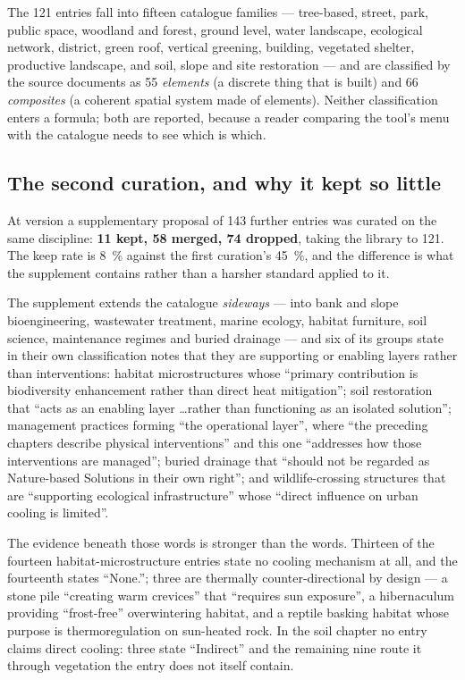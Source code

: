 The \num{121} entries fall into fifteen catalogue families --- tree-based,
street, park, public space, woodland and forest, ground level, water landscape,
ecological network, district, green roof, vertical greening, building,
vegetated shelter, productive landscape, and soil, slope and site restoration
--- and are classified by the source documents as \num{55} \emph{elements} (a
discrete thing that is built) and \num{66} \emph{composites} (a coherent
spatial system made of elements). Neither classification enters a formula; both
are reported, because a reader comparing the tool's menu with the catalogue
needs to see which is which.

\subsection{The second curation, and why it kept so little}
\label{sec:supplement}

At version \methver{} a supplementary proposal of \num{143} further entries was
curated on the same discipline: \textbf{\num{11} kept, \num{58} merged,
\num{74} dropped}, taking the library to \num{121}. The keep rate is
\SI{8}{\percent} against the first curation's \SI{45}{\percent}, and the
difference is what the supplement contains rather than a harsher standard
applied to it.

The supplement extends the catalogue \emph{sideways} --- into bank and slope
bioengineering, wastewater treatment, marine ecology, habitat furniture, soil
science, maintenance regimes and buried drainage --- and six of its groups state
in their own classification notes that they are supporting or enabling layers
rather than interventions: habitat microstructures whose ``primary contribution
is biodiversity enhancement rather than direct heat mitigation''; soil
restoration that ``acts as an enabling layer \ldots rather than functioning as
an isolated solution''; management practices forming ``the operational layer'',
where ``the preceding chapters describe physical interventions'' and this one
``addresses how those interventions are managed''; buried drainage that
``should not be regarded as Nature-based Solutions in their own right''; and
wildlife-crossing structures that are ``supporting ecological infrastructure''
whose ``direct influence on urban cooling is limited''.

The evidence beneath those words is stronger than the words. Thirteen of the
fourteen habitat-microstructure entries state no cooling mechanism at all, and
the fourteenth states ``None.''; three are thermally counter-directional by
design --- a stone pile ``creating warm crevices'' that ``requires sun
exposure'', a hibernaculum providing ``frost-free'' overwintering habitat, and a
reptile basking habitat whose purpose is thermoregulation on sun-heated rock. In
the soil chapter no entry claims direct cooling: three state ``Indirect'' and
the remaining nine route it through vegetation the entry does not itself
contain.

